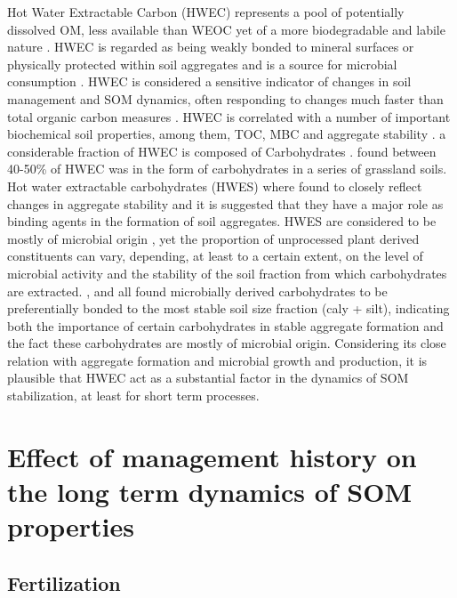\documentclass[12pt]{report}
\begin{document}
	Hot Water Extractable Carbon (HWEC) represents a pool of potentially dissolved OM, less available than WEOC yet of a more biodegradable and labile nature \citep{chantigny2014, leinweber1995, gregorich2003}. HWEC is regarded as being weakly bonded to mineral surfaces or physically protected within soil aggregates and is a source for microbial consumption \citep{zakharova2015, leinweber1995}.
	HWEC is considered a  sensitive indicator of changes in soil management and SOM dynamics, often responding to changes much faster than total organic carbon measures \citep{ghani2003}. HWEC is correlated with a number of important biochemical soil properties, among them, TOC, MBC and aggregate stability \citep{hamkalo2014}.
	a considerable fraction of HWEC is composed of Carbohydrates \citep{leinweber1995, balaria2009}. \citet{ghani2003} found between 40-50\% of HWEC was in the form of carbohydrates in a series of grassland soils.
	Hot water extractable carbohydrates (HWES) where found to  closely reflect changes in aggregate stability \citep{haynes2005, yousefi2008, leguillou2012} and it is suggested that they have a major role as binding agents in the formation of soil aggregates.
	HWES are considered to be mostly of microbial origin \citep{haynes1993, debosz2002}, yet the proportion of unprocessed plant derived constituents can vary, depending, at least to a certain extent, on the level of microbial activity and the stability of the soil fraction from which carbohydrates are extracted. \citet{puget1998}, \citet{jolivet2006} and \citet{bock2007} all found microbially derived carbohydrates to be preferentially bonded to the most stable soil size fraction (caly + silt), indicating both the importance of certain  carbohydrates in stable aggregate formation and the fact these carbohydrates are mostly of microbial origin.
	Considering its close relation with aggregate formation and microbial growth and production, it is plausible that HWEC act as a substantial factor in  the dynamics of SOM stabilization, at least for short term processes.
	
\section{Effect of management history on the long term dynamics of SOM properties}

 	\subsection{Fertilization}
 	
\end{document}
